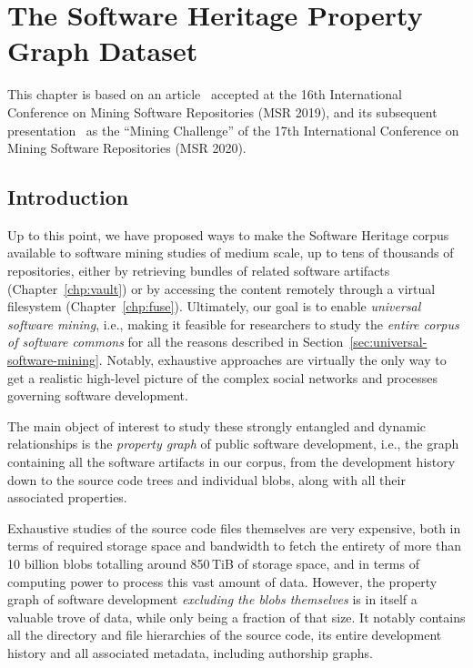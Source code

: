 \chapter{The Software Heritage Property Graph Dataset}

This chapter is based on an article~\cite{swh-msr2019-dataset} accepted at the
16th International Conference on Mining Software Repositories (MSR 2019), and
its subsequent presentation~\cite{msr-2020-challenge} as the ``Mining
Challenge'' of the 17th International Conference on Mining Software
Repositories (MSR 2020).

\section{Introduction}

Up to this point, we have proposed ways to make the Software Heritage corpus
available to software mining studies of medium scale, up to tens of thousands
of repositories, either by retrieving bundles of related software artifacts
(Chapter~\ref{chp:vault}) or by accessing the content remotely through a
virtual filesystem (Chapter~\ref{chp:fuse}). Ultimately, our goal is to enable
\emph{universal software mining}, i.e., making it feasible for researchers to
study the \emph{entire corpus of software commons} for all the reasons
described in Section~\ref{sec:universal-software-mining}. Notably, exhaustive
approaches are virtually the only way to get a realistic high-level picture of
the complex social networks and processes governing software development.

The main object of interest to study these strongly entangled and dynamic
relationships is the \emph{property graph} of public software development,
i.e., the graph containing all the software artifacts in our corpus, from the
development history down to the source code trees and individual blobs, along
with all their associated properties.

Exhaustive studies of the source code files themselves are very expensive, both
in terms of required storage space and bandwidth to fetch the entirety of more
than 10 billion blobs totalling around 850\,TiB of storage space, and in terms
of computing power to process this vast amount of data. However, the property
graph of software development \emph{excluding the blobs themselves} is in
itself a valuable trove of data, while only being a fraction of that size.
It notably contains all the directory and file hierarchies of the source code,
its entire development history and all associated metadata, including
authorship graphs.

